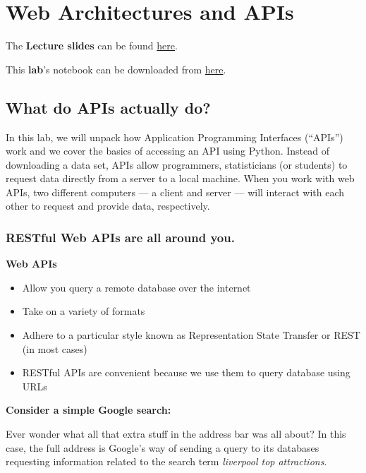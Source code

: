 \documentclass[
  letterpaper,
  DIV=11,
  numbers=noendperiod]{scrreprt}
\providecommand{\tightlist}{%
  \setlength{\itemsep}{0pt}\setlength{\parskip}{0pt}}\usepackage{longtable,booktabs,array}
\begin{document}

\chapter{Web Architectures and APIs}\label{web-architectures-and-apis}

The \textbf{Lecture slides} can be found
\href{https://github.com/GDSL-UL/wma/raw/main/lectures/w03.pdf}{here}.

This \textbf{lab}'s notebook can be downloaded from
\href{https://github.com/GDSL-UL/wma/blob/main/labs/w03_webArch.ipynb}{here}.

\section{What do APIs actually do?}\label{what-do-apis-actually-do}

In this lab, we will unpack how Application Programming Interfaces
(``APIs'') work and we cover the basics of accessing an API using
Python. Instead of downloading a data set, APIs allow programmers,
statisticians (or students) to request data directly from a server to a
local machine. When you work with web APIs, two different computers ---
a client and server --- will interact with each other to request and
provide data, respectively.

\subsection{RESTful Web APIs are all around
you.}\label{restful-web-apis-are-all-around-you.}

\textbf{Web APIs}

\begin{itemize}
\tightlist
\item
  Allow you query a remote database over the internet
\item
  Take on a variety of formats
\item
  Adhere to a particular style known as Representation State Transfer or
  REST (in most cases)
\item
  RESTful APIs are convenient because we use them to query database
  using URLs
\end{itemize}

\textbf{Consider a simple Google search:}

Ever wonder what all that extra stuff in the address bar was all about?
In this case, the full address is Google's way of sending a query to its
databases requesting information related to the search term
\emph{liverpool top attractions}.
\end{document}
